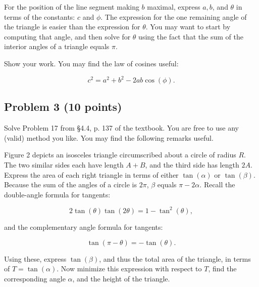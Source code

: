 \documentclass[12pt]{article}
\begin{document}
For the position of the line segment making \( b \) maximal, express \( a, b \), and \( \theta \) in terms of the constants: \( c \) and \( \phi \). The expression for the one remaining angle of the triangle is easier than the expression for \( \theta \). You may want to start by computing that angle, and then solve for \( \theta \) using the fact that the sum of the interior angles of a triangle equals \( \pi \).

Show your work. You may find the law of cosines useful:

\[
c^2 = a^2 + b^2 - 2ab \cos(\phi).
\]

\subsection*{Problem 3 (10 points)}
Solve Problem 17 from §4.4, p. 137 of the textbook. You are free to use any (valid) method you like. You may find the following remarks useful.

Figure 2 depicts an isosceles triangle circumscribed about a circle of radius \( R \). The two similar sides each have length \( A + B \), and the third side has length \( 2A \). Express the area of each right triangle in terms of either \( \tan(\alpha) \) or \( \tan(\beta) \). Because the sum of the angles of a circle is \( 2\pi \), \( \beta \) equals \( \pi - 2\alpha \). Recall the double-angle formula for tangents:

\[
2 \tan(\theta) \tan(2\theta) = 1 - \tan^2(\theta),
\]

and the complementary angle formula for tangents:

\[
\tan(\pi - \theta) = -\tan(\theta).
\]

Using these, express \( \tan(\beta) \), and thus the total area of the triangle, in terms of \( T = \tan(\alpha) \). Now minimize this expression with respect to \( T \), find the corresponding angle \( \alpha \), and the height of the triangle.
\end{document}
